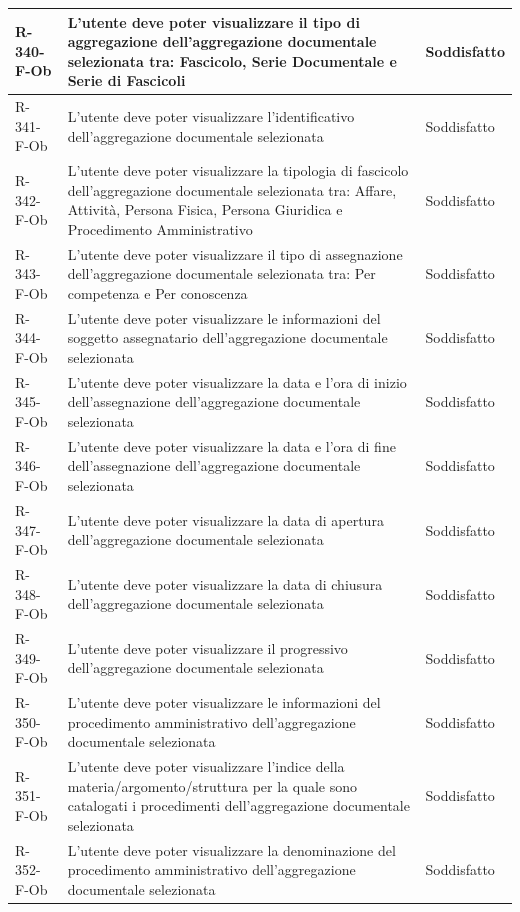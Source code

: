 \begin{longtable}{|p{2.5cm}|p{9.5cm}|p{2.5cm}|}
\hline
R-340-F-Ob & L'utente deve poter visualizzare il tipo di aggregazione dell'aggregazione documentale selezionata tra: Fascicolo, Serie Documentale e Serie di Fascicoli & Soddisfatto \\
\hline
R-341-F-Ob & L'utente deve poter visualizzare l'identificativo dell'aggregazione documentale selezionata & Soddisfatto \\
\hline
R-342-F-Ob & L'utente deve poter visualizzare la tipologia di fascicolo dell'aggregazione documentale selezionata tra: Affare, Attività, Persona Fisica, Persona Giuridica e Procedimento Amministrativo & Soddisfatto \\
\hline
R-343-F-Ob & L'utente deve poter visualizzare il tipo di assegnazione dell'aggregazione documentale selezionata tra: Per competenza e Per conoscenza & Soddisfatto \\
\hline
R-344-F-Ob & L'utente deve poter visualizzare le informazioni del soggetto assegnatario dell'aggregazione documentale selezionata &  Soddisfatto \\
\hline
R-345-F-Ob & L'utente deve poter visualizzare la data e l'ora di inizio dell'assegnazione dell'aggregazione documentale selezionata & Soddisfatto \\
\hline
R-346-F-Ob & L'utente deve poter visualizzare la data e l'ora di fine dell'assegnazione dell'aggregazione documentale selezionata & Soddisfatto \\
\hline
R-347-F-Ob & L'utente deve poter visualizzare la data di apertura dell'aggregazione documentale selezionata & Soddisfatto \\
\hline
R-348-F-Ob & L'utente deve poter visualizzare la data di chiusura dell'aggregazione documentale selezionata & Soddisfatto \\
\hline
R-349-F-Ob & L'utente deve poter visualizzare il progressivo dell'aggregazione documentale selezionata & Soddisfatto \\
\hline
R-350-F-Ob & L'utente deve poter visualizzare le informazioni del procedimento amministrativo dell'aggregazione documentale selezionata & Soddisfatto \\
\hline
R-351-F-Ob & L'utente deve poter visualizzare l'indice della materia/argomento/struttura per la quale sono catalogati i procedimenti dell'aggregazione documentale selezionata & Soddisfatto \\
\hline
R-352-F-Ob & L'utente deve poter visualizzare la denominazione del procedimento amministrativo dell'aggregazione documentale selezionata & Soddisfatto \\

\end{longtable}
